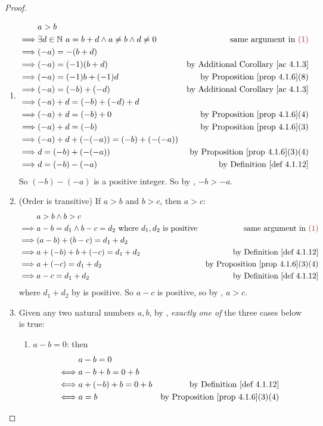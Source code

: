 \begin{proof}
\begin{enumerate}
\item
    \begin{align*}
                 & a > b \\
        \implies & \exists d \in \SET{N}\ a = b + d \land a \neq b \land d \neq 0 & \text{same argument in \MAROON{(1)}} \\
        \implies & (-a) = -(b + d) \\
        \implies & (-a) = (-1)(b + d) & \text{by \AC{4.1.3}} \\
        \implies & (-a) = (-1)b + (-1)d & \text{by \PROP{4.1.6}(8)} \\
        \implies & (-a) = (-b) + (-d) & \text{by \AC{4.1.3}} \\
        \implies & (-a) + d = (-b) + (-d) + d \\
        \implies & (-a) + d = (-b) + 0 & \text{by \PROP{4.1.6}(4)} \\
        \implies & (-a) + d = (-b) & \text{by \PROP{4.1.6}(3)} \\
        \implies & (-a) + d + (-(-a)) = (-b) + (-(-a)) \\
        \implies & d = (-b) + (-(-a)) & \text{by \PROP{4.1.6}(3)(4)} \\
        \implies & d = (-b) - (-a) & \text{by \DEF{4.1.12}}
    \end{align*}
    So \((-b) - (-a)\) is a positive integer. So by , \(-b > -a\).

\item (Order is transitive) If \(a > b\) and \(b > c\), then \(a > c\):
    \begin{align*}
                 & a > b \land b > c \\
        \implies & a - b = d_1 \land b - c = d_2 \text{\ where \(d_1, d_2\) is positive} & \text{same argument in \MAROON{(1)}} \\
        \implies & (a - b) + (b - c) = d_1 + d_2 \\
        \implies & a + (-b) + b + (-c) = d_1 + d_2 & \text{by \DEF{4.1.12}} \\
        \implies & a + (-c) = d_1 + d_2 & \text{by \PROP{4.1.6}(3)(4)} \\
        \implies & a - c = d_1 + d_2 & \text{by \DEF{4.1.12}}
    \end{align*}
    where \(d_1 + d_2\) by  is positive.
    So \(a - c\) is positive, so by , \(a > c\).

\item
    Given any two natural numbers \(a, b\), by , \emph{exactly one of} the three cases below is true:
    \begin{enumerate}
        \item \(a - b = 0\): then
            \begin{align*}
                     & a - b = 0 \\
                \iff & a - b + b = 0 + b \\
                \iff & a + (-b) + b = 0 + b & \text{by \DEF{4.1.12}} \\
                \iff & a = b & \text{by \PROP{4.1.6}(3)(4)}
            \end{align*}
            

\end{enumerate}
\end{enumerate}
\end{proof}
